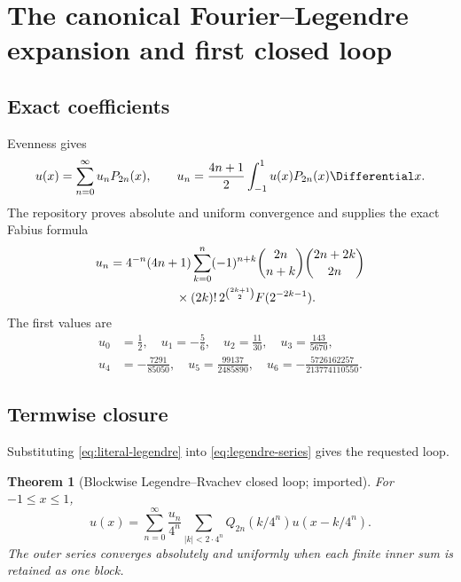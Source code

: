 \documentclass[11pt,oneside]{article}
\numberwithin{equation}{section}
\newtheorem{theorem}{Theorem}[section]
\theoremstyle{definition}
\theoremstyle{remark}
\begin{document}
\section{The canonical Fourier--Legendre expansion and first closed loop}
\label{sec:first-loop}

\subsection{Exact coefficients}

Evenness gives
\begin{equation}
 u(x)=\sum_{n=0}^{\infty}u_nP_{2n}(x),\qquad
 u_n=\frac{4n+1}{2}\int_{-1}^{1}u(x)P_{2n}(x)\Differential x.
 \label{eq:legendre-series}
\end{equation}
The repository proves absolute and uniform convergence and supplies the exact
Fabius formula \cite{ReshetnikovPrimary}
\begin{align}
 u_n={}&4^{-n}(4n+1)\sum_{k=0}^{n}(-1)^{n+k}
 \binom{2n}{n+k}\binom{2n+2k}{2n}\notag\\
 &\hspace{4em}\times(2k)!\,2^{\binom{2k+1}{2}}F(2^{-2k-1}).
 \label{eq:un-fabius}
\end{align}
The first values are
\begin{equation}
 \begin{split}
 u_0&=\frac12,\quad u_1=-\frac56,\quad u_2=\frac{11}{30},
 \quad u_3=\frac{143}{5670},\\
 u_4&=-\frac{7291}{85050},\quad u_5=\frac{99137}{2485890},
 \quad u_6=-\frac{5726162257}{213774110550}.
 \end{split}
 \label{eq:first-un}
\end{equation}

\subsection{Termwise closure}

Substituting \eqref{eq:literal-legendre} into \eqref{eq:legendre-series}
gives the requested loop.

\begin{theorem}[Blockwise Legendre--Rvachev closed loop; imported]
\label{thm:block-loop}
For $-1\le x\le1$,
\begin{equation}
 \boxed{
 u(x)=\sum_{n=0}^{\infty}\frac{u_n}{4^n}
 \sum_{|k|<2\cdot4^n}Q_{2n}(k/4^n)u(x-k/4^n).}
 \label{eq:block-loop}
\end{equation}
The outer series converges absolutely and uniformly when each finite inner sum
is retained as one block.
\end{theorem}
\end{document}
